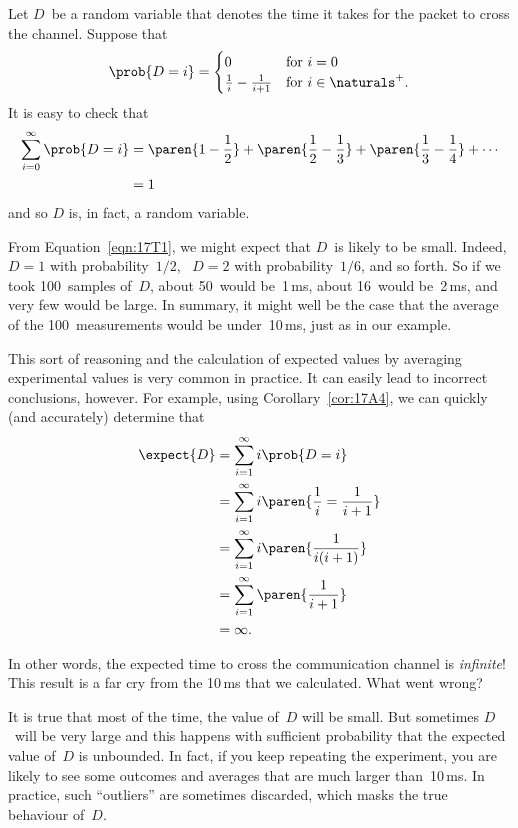 Let $D$~be a random variable that denotes the time it takes for the
packet to cross the channel.  Suppose that 
\begin{equation}\label{eqn:17T1}
\prob{D = i} = \begin{cases}
                0 & \text{for $i = 0$} \\
                \frac{1}{i} - \frac{1}{i + 1}   & \text{for $i \in \naturals^+$}.
               \end{cases}
\end{equation}
It is easy to check that
\begin{align*}
\sum_{i = 0}^\infty \prob{D = i}
    &= \paren{1 - \frac{1}{2}} + \paren{\frac{1}{2} - \frac{1}{3}}
        + \paren{\frac{1}{3} - \frac{1}{4}} + \cdots \\
    &= 1
\end{align*}
and so $D$ is, in fact, a random variable.

From Equation~\ref{eqn:17T1}, we might expect that $D$~is likely to be
small.  Indeed, $D = 1$ with probability~$1/2$, \ $D = 2$ with
probability~$1/6$, and so forth.  So if we took 100~samples of~$D$,
about 50~would be~1\,ms, about 16~would be~2\,ms, and very few would
be large.  In summary, it might well be the case that the average of
the 100~measurements would be under~10\,ms, just as in our example.

This sort of reasoning and the calculation of expected values by
averaging experimental values is very common in practice.  It can
easily lead to incorrect conclusions, however.  For example, using
Corollary~\ref{cor:17A4}, we can quickly (and accurately) determine
that
\begin{align*}
\expect{D}
    &= \sum_{i = 1}^\infty i \prob{D = i} \\
    &= \sum_{i = 1}^\infty i \paren{\frac{1}{i} = \frac{1}{i + 1}} \\
    &= \sum_{i = 1}^\infty i \paren{\frac{1}{i (i + 1)}} \\
    &= \sum_{i = 1}^\infty \paren{\frac{1}{i + 1}} \\
    &= \infty.
\end{align*}

In other words, the expected time to cross the communication channel
is \emph{infinite}!  This result is a far cry from the 10\,ms that we
calculated.  What went wrong?

It is true that most of the time, the value of~$D$ will be small.  But
sometimes $D$~will be very large and this happens with sufficient
probability that the expected value of~$D$ is unbounded.  In fact, if
you keep repeating the experiment, you are likely to see some outcomes
and averages that are much larger than~10\,ms.  In practice, such
``outliers'' are sometimes discarded, which masks the true behaviour
of~$D$.

